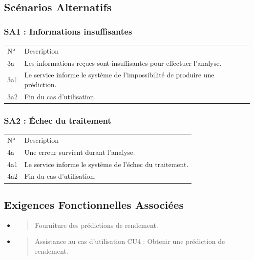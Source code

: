 \documentclass[
]{book}
\begin{document}
\hypertarget{scuxe9narios-alternatifs-7}{%
\subsection{Scénarios Alternatifs}\label{scuxe9narios-alternatifs-7}}

\hypertarget{sa1-informations-insuffisantes}{%
\subsubsection{SA1 : Informations
insuffisantes}\label{sa1-informations-insuffisantes}}

\begin{longtable}[]{@{}ll@{}}
\toprule
\endhead
N° & Description \\
3a & Les informations reçues sont insuffisantes pour effectuer
l'analyse. \\
3a1 & Le service informe le système de l'impossibilité de produire une
prédiction. \\
3a2 & Fin du cas d'utilisation. \\
\bottomrule
\end{longtable}

\hypertarget{sa2-uxe9chec-du-traitement}{%
\subsubsection{SA2 : Échec du
traitement}\label{sa2-uxe9chec-du-traitement}}

\begin{longtable}[]{@{}ll@{}}
\toprule
\endhead
N° & Description \\
4a & Une erreur survient durant l'analyse. \\
4a1 & Le service informe le système de l'échec du traitement. \\
4a2 & Fin du cas d'utilisation. \\
\bottomrule
\end{longtable}

\hypertarget{exigences-fonctionnelles-associuxe9es-7}{%
\subsection{Exigences Fonctionnelles
Associées}\label{exigences-fonctionnelles-associuxe9es-7}}

\begin{itemize}
\item
  \begin{quote}
  Fourniture des prédictions de rendement.
  \end{quote}
\item
  \begin{quote}
  Assistance au cas d'utilisation CU4 : Obtenir une prédiction de
  rendement.
  \end{quote}
\end{itemize}
\end{document}
